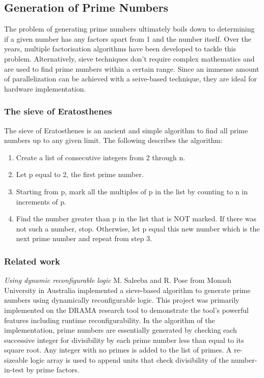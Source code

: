\documentclass[journal]{IEEEtran}
\begin{document}
\subsection{Generation of Prime Numbers}
The problem of generating prime numbers ultimately boils down to determining if a given number has any factors apart from 1 and the number itself. Over the years, multiple factorisation algorithms have been developed to tackle this problem. Alternatively, sieve techniques don't require complex mathematics and are used to find prime numbers within a certain range. Since an immense amount of parallelization can be achieved with a seive-based technique, they are ideal for hardware implementation.

\subsubsection{The sieve of Eratosthenes}
The sieve of Eratosthenes is an ancient and simple algorithm to find all prime numbers up to any given limit. The following describes the algorithm: \\

\begin{enumerate}

	\item Create a list of consecutive integers from 2 through n.
	\item Let p equal to 2, the first prime number.
	\item Starting from p, mark all the multiples of p in the list by counting to n in increments of p.
	\item Find the number greater than p in the list that is NOT marked. If there was not such a number, stop. Otherwise, let p equal this new number which is the next prime number and repeat from step 3. \\

\end{enumerate} 

\subsubsection{Related work}

\textit{Using dynamic reconfigurable logic}
M. Saleeba and R. Pose from Monash University in Australia implemented a sieve-based algorithm to generate prime numbers using dynamically reconfigurable logic. This project was primarily implemented on the DRAMA research tool to demonstrate the tool's powerful features including runtime reconfigurability. In the algorithm of the implementation, prime numbers are essentially generated by checking each successive integer for divisibility by each prime number less than equal to its square root. Any integer with no primes is added to the list of primes. A re-sizeable logic array is used to append units that check divisibility of the number-in-test by prime factors.
\end{document}
